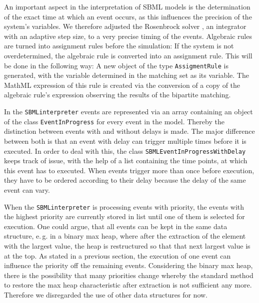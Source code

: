 \documentclass[10pt]{bmc_article}
\newenvironment{bmcformat}{\baselineskip20pt\sloppy\setboolean{publ}{false}}{\baselineskip20pt\sloppy}
\newcommand{\SBMLinterpreter}{\texttt{SBML\-interpreter}}
\newcommand{\EventInProgress}{\texttt{Event\-In\-Progress}}
\newcommand{\SBMLEventInProgressWithDelay}{\texttt{SBML\-Event\-In\-Progress\-With\-Delay}}
\begin{document}
\begin{bmcformat}
%
An important aspect in the interpretation of SBML models is the
determination of the exact time at which an event occurs, as this influences
the precision of the system's variables. We therefore adjusted the Rosenbrock
solver \cite{Kotcon2011}, an integrator with an adaptive step size, to a very
precise timing of the events.
%
Algebraic rules are turned into assignment rules before the
simulation: If the system is not overdetermined, the algebraic rule is converted into an assignment rule.
This will be done in the following way: A new object of the type \texttt{AssigmentRule} is generated, with the variable determined in the matching set as its variable. The MathML expression of this rule is created via the conversion of a copy of the algebraic rule's expression observing the results of the bipartite matching.
%

In the \SBMLinterpreter{} events are represented via an array containing an object of the class \EventInProgress{} for every event in the model. Thereby the distinction between events with and without delays is made. The major difference between both is that an event with delay can trigger multiple times before it is executed. In order to deal with this, the class \SBMLEventInProgressWithDelay{} keeps track of issue, with the help of a list containing the time points, at which this event has to executed. When events trigger more than once before execution, they have to be ordered according to their delay because the delay of the same event can vary.

When the \SBMLinterpreter{} is processing events with priority, the events with the highest priority 
are currently stored in list until one of them is selected for execution. One could argue, that all events can
be kept in the same data structure, e.\,g. in a binary max heap, where after the extraction of the element with the largest value, the heap is restructured so that that next largest value is at the top. As stated
in a previous section, the execution of one event can influence the priority off the remaining events. Considering the binary max heap, there is the possibility that many priorities change whereby the standard
method to restore the max heap characteristic after extraction is not sufficient any more. Therefore we disregarded the use of other data structures for now.
%


\end{bmcformat}
\end{document}
